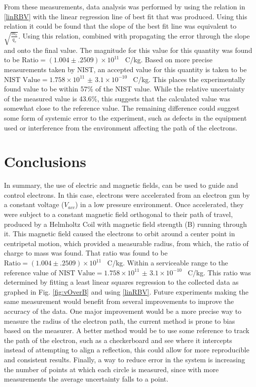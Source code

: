 \documentclass[rc]{physicsinprogress}
\begin{document}
From these measurements, data analysis was performed \cite{supp} by using the relation in \eqref{linRBV} with the linear regression line of best fit that was produced. Using this relation it could be found that the slope of the best fit line was equivalent to $\sqrt{\frac{m_e}{q_e}}$. Using this relation, combined with propagating the error through the slope and onto the final value. The magnitude for this value for this quantity was found to be $\text{Ratio} = ( 1.004 \pm .2509 )\times 10^{11}$ \SI{}{C/kg}. Based on more precise measurements taken by NIST, an accepted value for this quantity is taken to be $\text{NIST Value} = 1.758 \times 10^{11}$  $\pm$ $3.1 \times 10^{-10}$  \SI{}{C/kg}. This places the experimentally found value to be within 57$\%$ of the NIST value. While the relative uncertainty of the measured value is 43.6$\%$, this suggests that the calculated value was somewhat close to the reference value. The remaining difference could suggest some form of systemic error to the experiment, such as defects in the equipment used or interference from the environment affecting the path of the electrons.



\section{Conclusions}
In summary, the use of electric and magnetic fields, can be used to guide and control electrons. In this case, electrons were accelerated from an electron gun by a constant voltage ($V_{acc}$) in a low pressure environment. Once accelerated, they were subject to a constant magnetic field orthogonal to their path of travel, produced by a Helmholtz Coil with magnetic field strength (B) running through it. This magnetic field caused the electrons to orbit around a center point in centripetal motion, which provided a measurable radius, from which, the ratio of charge to mass was found. That ratio was found to be $\text{Ratio} = ( 1.004 \pm .2509 )\times 10^{11}$ \SI{}{C/kg}. Within a serviceable range to the reference value of $\text{NIST Value} = 1.758 \times 10^{11}$  $\pm$ $3.1 \times 10^{-10}$  \SI{}{C/kg}. This ratio was determined by fitting a least linear squares regression to the collected data as graphed in Fig. \ref{fig:vOverB} and using \eqref{linRBV}. Future experiments making the same measurement would benefit from several improvements to improve the accuracy of the data. One major improvement would be a more precise way to measure the radius of the electron path, the current method is prone to bias based on the measurer. A better method would be to use some reference to track the path of the electron, such as a checkerboard and see where it intercepts instead of attempting to align a reflection, this could allow for more reproducible and consistent results. Finally, a way to reduce error in the system is increasing the number of points at which each circle is measured, since with more measurements the average uncertainty falls to a point.
\end{document}
